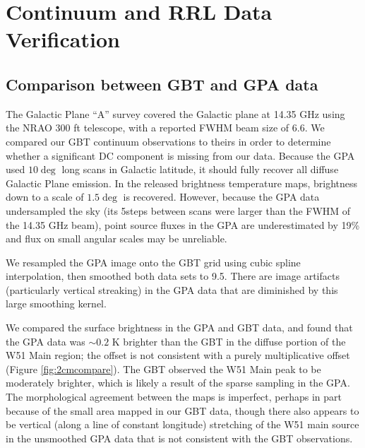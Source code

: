 \appendix
\section{Continuum and RRL Data Verification}
\label{sec:contrrldata}
\subsection{Comparison between GBT and GPA data}
\label{sec:gpacompare}
The Galactic Plane ``A'' survey \citep{Langston2000a} covered the Galactic
plane at 14.35 GHz using the NRAO 300 ft telescope, with a reported FWHM beam
size of 6.6\arcmin.  We compared our GBT continuum observations to theirs in
order to determine whether a significant DC component is missing from our data.
Because the GPA used $10\deg$ long scans in Galactic latitude, it should fully
recover all diffuse Galactic Plane emission.  In the released brightness temperature
maps, brightness down to a scale of $1.5\deg$ is recovered.  However, because
the GPA data undersampled the sky (its 5\arcmin steps between scans were larger
than the FWHM of the 14.35 GHz beam), point source fluxes in the GPA are
underestimated by 19\% and flux on small angular scales may be unreliable.


We resampled the GPA image onto the GBT grid using cubic spline interpolation,
then smoothed both data sets to 9.5\arcmin.  There are image artifacts
(particularly vertical streaking) in the GPA data that are diminished by this
large smoothing kernel.

We compared the surface brightness in the GPA and GBT data, and found that the
GPA data was $\sim0.2$ K brighter than the GBT in the diffuse portion of the
W51 Main region; the offset is not consistent with a purely multiplicative
offset (Figure \ref{fig:2cmcompare}).  The GBT observed the W51 Main peak to be
moderately brighter, which is likely a result of the sparse sampling in the
GPA.  The morphological agreement between the maps is imperfect, perhaps in
part because of the small area mapped in our GBT data, though there also
appears to be vertical (along a line of constant longitude) stretching of the
W51 main source in the unsmoothed GPA data that is not consistent with the GBT
observations.

